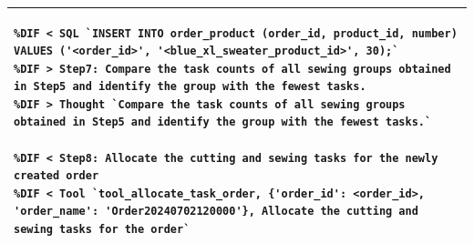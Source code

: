 \documentclass[preprint,12pt]{elsarticle}
\providecommand{\DIFmodend}{} %
\begin{document}
\begin{center}
\begin{longtable}{p{390pt}}
\begin{lstlisting}[style=my_operation, label={lst:chain_of_operation},alsolanguage=DIFcode]
%DIF < Step7: Insert 30 units of the product "Blue, XL size Sweater" into the order
%DIF < SQL `INSERT INTO order_product (order_id, product_id, number) VALUES ('<order_id>', '<blue_xl_sweater_product_id>', 30);`
%DIF > Step7: Compare the task counts of all sewing groups obtained in Step5 and identify the group with the fewest tasks.
%DIF > Thought `Compare the task counts of all sewing groups obtained in Step5 and identify the group with the fewest tasks.`

%DIF < Step8: Allocate the cutting and sewing tasks for the newly created order
%DIF < Tool `tool_allocate_task_order, {'order_id': <order_id>, 'order_name': 'Order20240702120000'}, Allocate the cutting and sewing tasks for the order`
\end{lstlisting}
\DIFmodend\\ \hline


\end{longtable}
\end{center}
\end{document}
